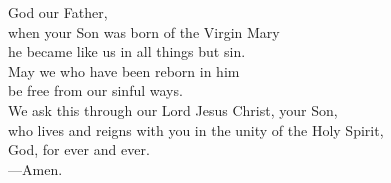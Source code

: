 \prayer

\begin{prayerverse}
God our Father,\\
when your Son was born of the Virgin Mary\\
he became like us in all things but sin.\\
May we who have been reborn in him\\
be free from our sinful ways.\\
We ask this through our Lord Jesus Christ, your Son,\\
who lives and reigns with you in the unity of the Holy Spirit,\\
God, for ever and ever.\\
{\color{red}---\thinspace}Amen.

\end{prayerverse}
